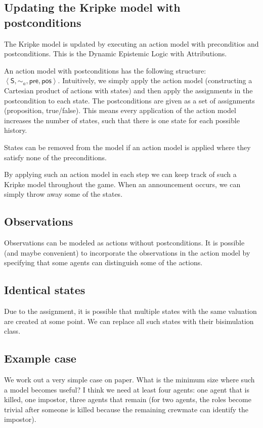 \documentclass[a4paper]{scrartcl}
\begin{document}
\subsection{Updating the Kripke model with postconditions}
The Kripke model is updated by executing an action model with preconditios and postconditions. This is the Dynamic Epistemic Logic with Attributions. 

An action model with postconditions has the following structure: $\left<\mathsf{S}, \sim_a, \mathsf{pre}, \mathsf{pos}\right>$. Intuitively, we simply apply the action model (constructing a Cartesian product of actions with states) and then apply the assignments in the postcondition to each state. The postconditions are given as a set of assignments (proposition, true/false). This means every application of the action model increases the number of states, such that there is one state for each possible history.

States can be removed from the model if an action model is applied where they satisfy none of the preconditions.

By applying such an action model in each step we can keep track of such a Kripke model throughout the game. When an announcement occurs, we can simply throw away some of the states. 

\subsection{Observations}
Observations can be modeled as actions without postconditions. It is possible (and maybe convenient) to incorporate the observations in the action model by specifying that some agents can distinguish some of the actions.

\subsection{Identical states}
Due to the assignment, it is possible that multiple states with the same valuation are created at some point. We can replace all such states with their bisimulation class.

\subsection{Example case}
We work out a very simple case on paper. What is the minimum size where such a model becomes useful? I think we need at least four agents: one agent that is killed, one impostor, three agents that remain (for two agents, the roles become trivial after someone is killed because the remaining crewmate can identify the impostor).
\end{document}
